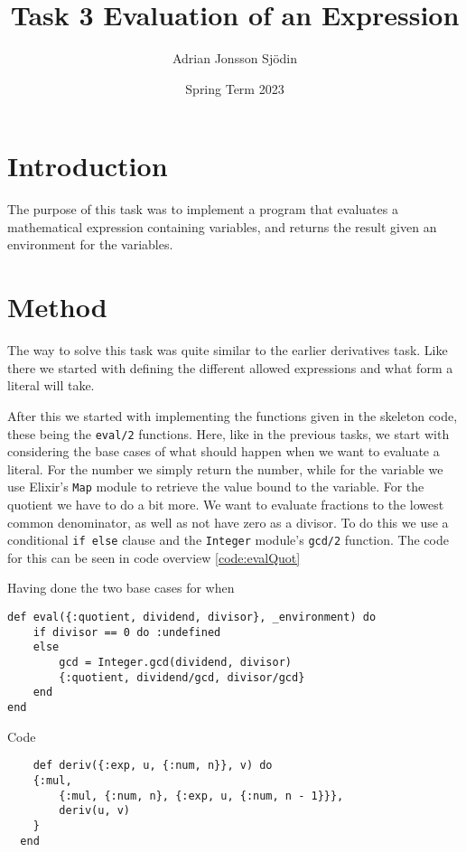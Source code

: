 \documentclass[a4paper,11pt]{article}
\newenvironment{code}{\captionsetup{type=listing}}{}
\begin{document}
\title{
    \textbf{Task 3 Evaluation of an Expression}
}
\author{Adrian Jonsson Sjödin}
\date{Spring Term 2023}

\maketitle

\section*{Introduction}
The purpose of this task was to implement a program that evaluates a mathematical expression containing variables, and returns the result 
given an environment for the variables. 

\section*{Method}
The way to solve this task was quite similar to the earlier derivatives task. Like there we started with defining the different allowed 
expressions and what form a literal will take. 

After this we started with implementing the functions given in the skeleton code, these being the {\tt eval/2} functions. Here, like in the previous tasks, we start with
considering the base cases of what should happen when we want to evaluate a literal. For the number we simply return the number, while for the variable we 
use Elixir's {\tt Map} module to retrieve the value bound to the variable. For the quotient we have to do a bit more. We want to evaluate fractions to the lowest common 
denominator, as well as not have zero as a divisor. To do this we use a conditional {\tt if else} clause and the {\tt Integer} module's {\tt gcd/2} function. The code 
for this can be seen in code overview \ref{code:evalQuot}

Having done the two base cases for when 

\begin{code}
\label{code:evalQuot}
\begin{verbatim}
def eval({:quotient, dividend, divisor}, _environment) do
    if divisor == 0 do :undefined
    else
        gcd = Integer.gcd(dividend, divisor)
        {:quotient, dividend/gcd, divisor/gcd}
    end
end
\end{verbatim}
\end{code}

Code
\begin{verbatim}
    def deriv({:exp, u, {:num, n}}, v) do
    {:mul, 
        {:mul, {:num, n}, {:exp, u, {:num, n - 1}}},
        deriv(u, v)
    }
  end
\end{verbatim}
\end{document}
